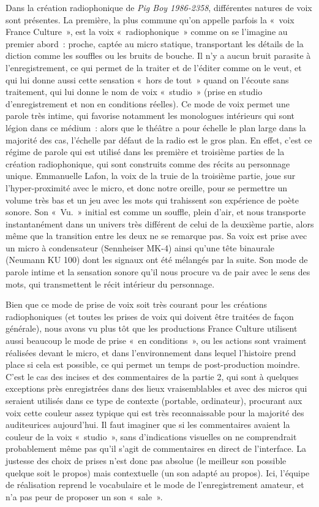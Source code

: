 \documentclass[
]{article}
\begin{document}
Dans la création radiophonique de \emph{Pig Boy 1986-2358}, différentes natures de voix sont présentes. La première, la plus commune qu'on appelle parfois la «~voix France Culture~», est la voix «~radiophonique~» comme on se l'imagine au premier abord~: proche, captée au micro statique, transportant les détails de la diction comme les souffles ou les bruits de bouche. Il n'y a aucun bruit parasite à l'enregistrement, ce qui permet de la traiter et de l'éditer comme on le veut, et qui lui donne aussi cette sensation «~hors de tout~» quand on l'écoute sans traitement, qui lui donne le nom de voix «~studio~» (prise en studio d'enregistrement et non en conditions réelles). Ce mode de voix permet une parole très intime, qui favorise notamment les monologues intérieurs qui sont légion dans ce médium~: alors que le théâtre a pour échelle le plan large dans la majorité des cas, l'échelle par défaut de la radio est le gros plan. En effet, c'est ce régime de parole qui est utilisé dans les première et troisième parties de la création radiophonique, qui sont construits comme des récits au personnage unique. Emmanuelle Lafon, la voix de la truie de la troisième partie, joue sur l'hyper-proximité avec le micro, et donc notre oreille, pour se permettre un volume très bas et un jeu avec les mots qui trahissent son expérience de poète sonore. Son «~Vu.~» initial est comme un souffle, plein d'air, et nous transporte instantanément dans un univers très différent de celui de la deuxième partie, alors même que la transition entre les deux ne se remarque pas. Sa voix est prise avec un micro à condensateur (Sennheiser MK-4) ainsi qu'une tête binaurale (Neumann KU 100) dont les signaux ont été mélangés par la suite. Son mode de parole intime et la sensation sonore qu'il nous procure va de pair avec le sens des mots, qui transmettent le récit intérieur du personnage.

Bien que ce mode de prise de voix soit très courant pour les créations radiophoniques (et toutes les prises de voix qui doivent être traitées de façon générale), nous avons vu plus tôt que les productions France Culture utilisent aussi beaucoup le mode de prise «~en conditions~», ou les actions sont vraiment réalisées devant le micro, et dans l'environnement dans lequel l'histoire prend place si cela est possible, ce qui permet un temps de post-production moindre. C'est le cas des incises et des commentaires de la partie 2, qui sont à quelques exceptions près enregistrées dans des lieux vraisemblables et avec des micros qui seraient utilisés dans ce type de contexte (portable, ordinateur), procurant aux voix cette couleur assez typique qui est très reconnaissable pour la majorité des auditeurices aujourd'hui. Il faut imaginer que si les commentaires avaient la couleur de la voix «~studio~», sans d'indications visuelles on ne comprendrait probablement même pas qu'il s'agit de commentaires en direct de l'interface. La justesse des choix de prises n'est donc pas absolue (le meilleur son possible quelque soit le propos) mais contextuelle (un son adapté au propos). Ici, l'équipe de réalisation reprend le vocabulaire et le mode de l'enregistrement amateur, et n'a pas peur de proposer un son «~sale~».
\end{document}
